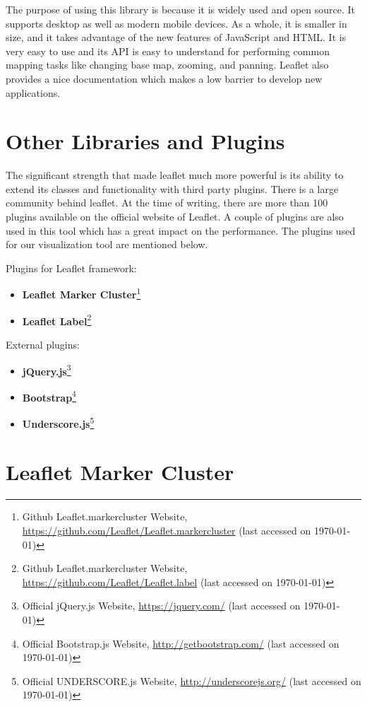 The purpose of using this library is because it is widely used and open source. It supports desktop as well as modern mobile devices. As a whole, it is smaller in size, and it takes advantage of the new features of JavaScript and HTML. It is very easy to use and its API is easy to understand for performing common mapping tasks like changing base map, zooming, and panning. Leaflet also provides a nice documentation which makes a low barrier to develop new applications.

\section{Other Libraries and Plugins}
\label{olandp}

The significant strength that made leaflet much more powerful is its ability to extend its classes and functionality with third party plugins. There is a large community behind leaflet. At the time of writing, there are more than 100 plugins available on the official website of Leaflet. A couple of plugins are also used in this tool which has a great impact on the performance. The plugins used for our visualization tool are mentioned below.

Plugins for Leaflet framework:
\begin{itemize}
  \item \textbf{Leaflet Marker Cluster}\footnote{Github Leaflet.markercluster Website, \url{https://github.com/Leaflet/Leaflet.markercluster} (last accessed on \today)}
  \item \textbf{Leaflet Label}\footnote{Github Leaflet.markercluster Website, \url{https://github.com/Leaflet/Leaflet.label} (last accessed on {\today})}
\end{itemize}
External plugins:
\begin{itemize}
  \item \textbf{jQuery.js}\footnote{Official jQuery.js Website, \url{https://jquery.com/} (last accessed on \today)}
  \item \textbf{Bootstrap}\footnote{Official Bootstrap.js Website, \url{http://getbootstrap.com/}   (last accessed on \today)}
  \item \textbf{Underscore.js}\footnote{Official UNDERSCORE.js Website, \url{http://underscorejs.org/}  (last accessed on \today)}
\end{itemize}

\section*{Leaflet Marker Cluster}
\label{sec:clusterr}

